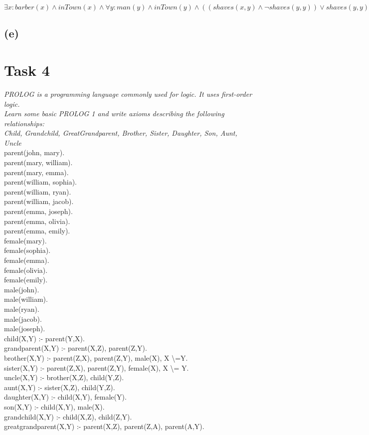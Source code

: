 \documentclass[paper=a4, fontsize=11pt]{scrartcl} %
\numberwithin{equation}{section} %
\numberwithin{figure}{section} %
\numberwithin{table}{section} %
\begin{document}
$\exists x: barber(x)\land inTown(x)\land \forall y: man(y) \land inTown(y)\land ((shaves(x,y) \land \neg shaves(y,y))\lor shaves(y,y))$ 

\subsection{(e)}


\section{Task 4}
\textit{PROLOG is a programming language commonly used for logic. It uses first-order logic.\\
Learn some basic PROLOG 1 and write axioms describing the following relationships:\\
Child, Grandchild, GreatGrandparent, Brother, Sister, Daughter, Son, Aunt, Uncle}\\

parent(john, mary).\\
parent(mary, william).\\
parent(mary, emma).\\
parent(william, sophia).\\
parent(william, ryan).\\
parent(william, jacob).\\
parent(emma, joseph).\\
parent(emma, olivia).\\
parent(emma, emily).\\
female(mary).\\
female(sophia).\\
female(emma).\\
female(olivia).\\
female(emily).\\
male(john).\\
male(william).\\
male(ryan).\\
male(jacob).\\
male(joseph).\\
child(X,Y) :- parent(Y,X).\\
grandparent(X,Y) :- parent(X,Z), parent(Z,Y).\\
brother(X,Y) :- parent(Z,X), parent(Z,Y), male(X), X \textbackslash =Y.\\
sister(X,Y) :- parent(Z,X), parent(Z,Y), female(X), X \textbackslash = Y.\\
uncle(X,Y) :- brother(X,Z), child(Y,Z).\\
aunt(X,Y) :- sister(X,Z), child(Y,Z).\\
daughter(X,Y) :- child(X,Y), female(Y).\\
son(X,Y) :- child(X,Y), male(X).\\
grandchild(X,Y) :- child(X,Z), child(Z,Y).\\
greatgrandparent(X,Y) :- parent(X,Z), parent(Z,A), parent(A,Y).\\
\end{document}
